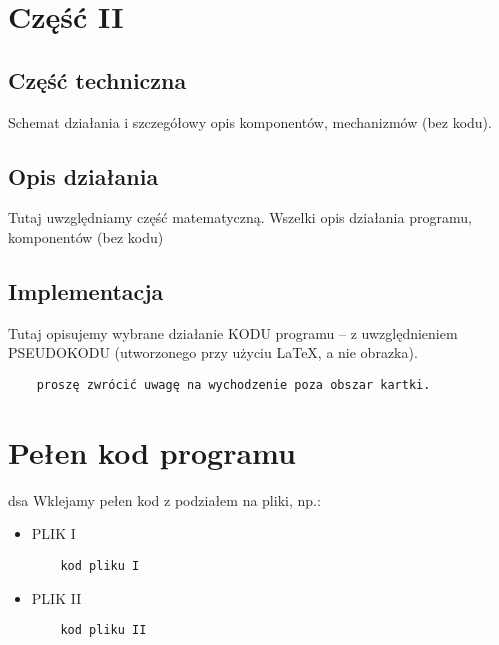 \documentclass[12pt,a4paper]{article}
\begin{document}
\newpage
	\section*{Część II}
	\subsection*{Część techniczna}
	Schemat działania i szczegółowy opis komponentów, mechanizmów (bez kodu).
	\subsection*{Opis działania} 
	Tutaj uwzględniamy część matematyczną. Wszelki opis działania programu, komponentów (bez kodu)
	\subsection*{Implementacja}
	Tutaj opisujemy wybrane działanie KODU programu -- z uwzględnieniem PSEUDOKODU (utworzonego przy użyciu \LaTeX, a nie obrazka).
	\begin{verbatim}
	proszę zwrócić uwagę na wychodzenie poza obszar kartki.
	\end{verbatim}
	\newpage
	\section*{Pełen kod programu}
dsa
	Wklejamy pełen kod z podziałem na pliki, np.:
	
	\begin{itemize}
	\item PLIK I
	\begin{verbatim}
	kod pliku I
	\end{verbatim}
	\item PLIK II
	\begin{verbatim}
	kod pliku II
	\end{verbatim}
	\end{itemize}
\end{document}
